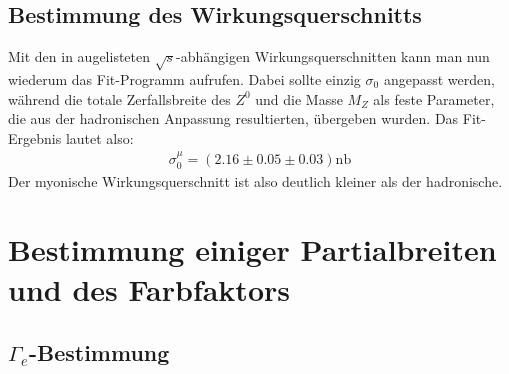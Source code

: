 \subsection{Bestimmung des Wirkungsquerschnitts}
Mit den in  augelisteten $\sqrt{s}$-abhängigen Wirkungsquerschnitten kann man nun wiederum das Fit-Programm aufrufen. Dabei sollte einzig $\sigma_0$ angepasst werden, während die totale Zerfallsbreite des $Z^0$ und die Masse $M_Z$ als feste Parameter, die aus der hadronischen Anpassung resultierten, übergeben wurden. Das Fit-Ergebnis lautet also:
\begin{eqnarray}
\sigma_0^{\mu} = (2.16 \pm 0.05 \pm 0.03)\si{\nano\barn}
\end{eqnarray}
Der myonische Wirkungsquerschnitt ist also deutlich kleiner als der hadronische.

\section{Bestimmung einiger Partialbreiten und des Farbfaktors}
\subsection{$\Gamma_e$-Bestimmung}

